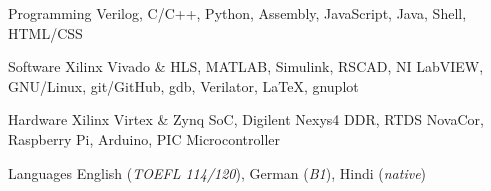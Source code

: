 \begin{cvskills}

\cvskill
	{Programming {\acvHeaderIconSep{}} {}} %
	{Verilog, C/C++, Python, Assembly, JavaScript, Java, Shell, HTML/CSS} %

\cvskill
	{Software {\acvHeaderIconSep{}} {}} %
	{Xilinx Vivado \& HLS, MATLAB, Simulink, RSCAD, NI LabVIEW, GNU/Linux, git/GitHub, gdb, Verilator, \LaTeX, gnuplot} %

\cvskill
	{Hardware {\acvHeaderIconSep{}} {}} %
	{Xilinx Virtex \& Zynq SoC, Digilent Nexys4 DDR, RTDS NovaCor, Raspberry Pi, Arduino, PIC Microcontroller} %

\cvskill
	{Languages {\acvHeaderIconSep{}} {}} %
	{English (\textit{TOEFL 114/120}), German (\textit{B1}), Hindi (\textit{native})} %

\end{cvskills}
